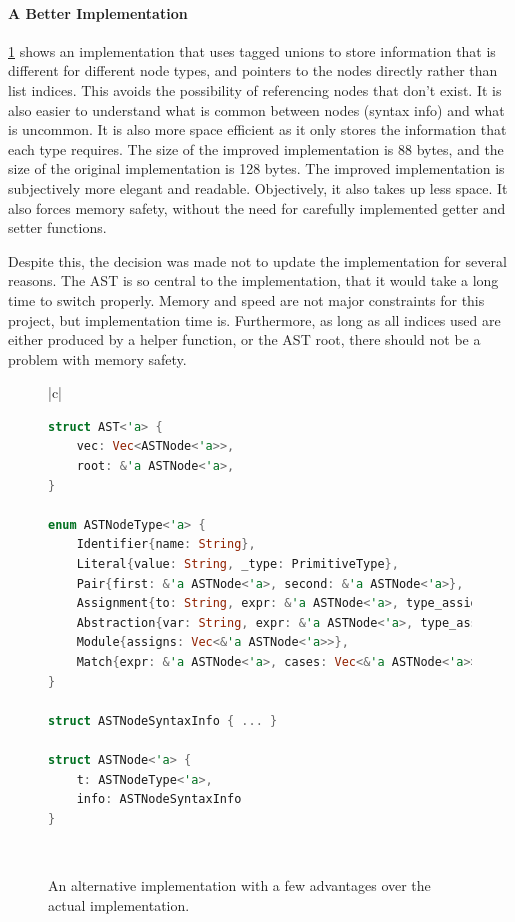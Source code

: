 \paragraph{A Better Implementation}
\ref{fig:ast_lst_2} shows an implementation that uses tagged unions to store information that is different for different node types, and pointers to the nodes directly rather than list indices. This avoids the possibility of referencing nodes that don't exist. It is also easier to understand what is common between nodes (syntax info) and what is uncommon. It is also more space efficient as it only stores the information that each type requires. The size of the improved implementation is 88 bytes, and the size of the original implementation is 128 bytes. The improved implementation is subjectively more elegant and readable. Objectively, it also takes up less space. It also forces memory safety, without the need for carefully implemented getter and setter functions. 

Despite this, the decision was made not to update the implementation for several reasons. The AST is so central to the implementation, that it would take a long time to switch properly. Memory and speed are not major constraints for this project, but implementation time is. Furthermore, as long as all indices used are either produced by a helper function, or the AST root, there should not be a problem with memory safety. 

\begin{figure}[t]
    \centering
    \begin{tabular}{|c|}
        \hline
    \begin{lstlisting}[language=Rust]
struct AST<'a> {
    vec: Vec<ASTNode<'a>>,
    root: &'a ASTNode<'a>,
}

enum ASTNodeType<'a> {
    Identifier{name: String},
    Literal{value: String, _type: PrimitiveType},
    Pair{first: &'a ASTNode<'a>, second: &'a ASTNode<'a>},
    Assignment{to: String, expr: &'a ASTNode<'a>, type_assign: Type},
    Abstraction{var: String, expr: &'a ASTNode<'a>, type_assign: Type},
    Module{assigns: Vec<&'a ASTNode<'a>>},
    Match{expr: &'a ASTNode<'a>, cases: Vec<&'a ASTNode<'a>>}
} 

struct ASTNodeSyntaxInfo { ... }

struct ASTNode<'a> {
    t: ASTNodeType<'a>,
    info: ASTNodeSyntaxInfo
}
    \end{lstlisting}
    \\\hline
    \end{tabular}
    \caption{An alternative implementation with a few advantages over the actual implementation. }
    \label{fig:ast_lst_2}
\end{figure}

